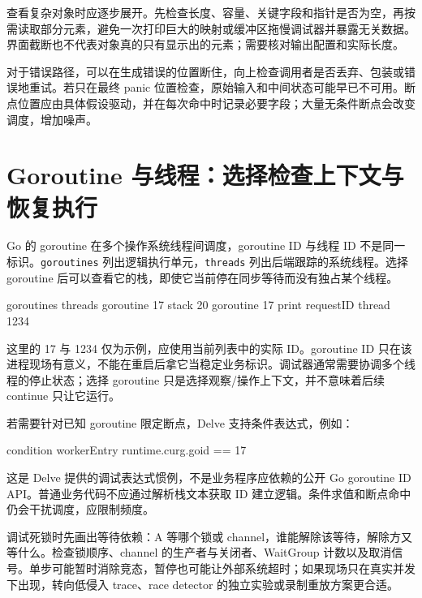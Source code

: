 \documentclass[UTF8,fontset=fandol,openany,11pt]{ctexbook}
\begin{document}
查看复杂对象时应逐步展开。先检查长度、容量、关键字段和指针是否为空，再按需读取部分元素，避免一次打印巨大的映射或缓冲区拖慢调试器并暴露无关数据。界面截断也不代表对象真的只有显示出的元素；需要核对输出配置和实际长度。

对于错误路径，可以在生成错误的位置断住，向上检查调用者是否丢弃、包装或错误地重试。若只在最终 panic 位置检查，原始输入和中间状态可能早已不可用。断点位置应由具体假设驱动，并在每次命中时记录必要字段；大量无条件断点会改变调度，增加噪声。

\section{Goroutine 与线程：选择检查上下文与恢复执行}
Go 的 goroutine 在多个操作系统线程间调度，goroutine ID 与线程 ID 不是同一标识。\texttt{goroutines} 列出逻辑执行单元，\texttt{threads} 列出后端跟踪的系统线程。选择 goroutine 后可以查看它的栈，即使它当前停在同步等待而没有独占某个线程。

\begin{codeblock}
goroutines
threads
goroutine 17
stack 20
goroutine 17 print requestID
thread 1234
\end{codeblock}

这里的 17 与 1234 仅为示例，应使用当前列表中的实际 ID。goroutine ID 只在该进程现场有意义，不能在重启后拿它当稳定业务标识。调试器通常需要协调多个线程的停止状态；选择 goroutine 只是选择观察/操作上下文，并不意味着后续 continue 只让它运行。

若需要针对已知 goroutine 限定断点，Delve 支持条件表达式，例如：

\begin{codeblock}
condition workerEntry runtime.curg.goid == 17
\end{codeblock}

这是 Delve 提供的调试表达式惯例，不是业务程序应依赖的公开 Go goroutine ID API。普通业务代码不应通过解析栈文本获取 ID 建立逻辑。条件求值和断点命中仍会干扰调度，应限制频度。\cite{tools-delve-cli}

调试死锁时先画出等待依赖：A 等哪个锁或 channel，谁能解除该等待，解除方又等什么。检查锁顺序、channel 的生产者与关闭者、WaitGroup 计数以及取消信号。单步可能暂时消除竞态，暂停也可能让外部系统超时；如果现场只在真实并发下出现，转向低侵入 trace、race detector 的独立实验或录制重放方案更合适。
\end{document}
